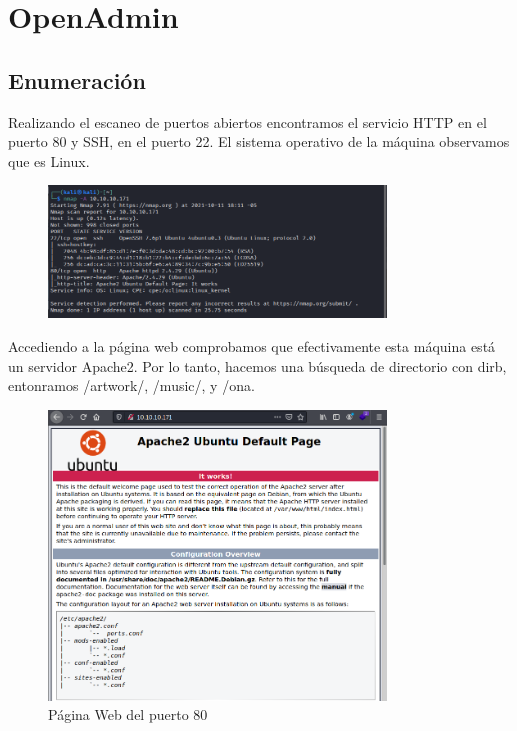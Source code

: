 \documentclass{article}
\begin{document}


\clearpage
\tableofcontents
\clearpage
\section{OpenAdmin}
\subsection{Enumeración}

Realizando el escaneo de puertos abiertos encontramos el servicio HTTP en el puerto 80 y SSH, en el puerto 22. El sistema operativo de la máquina observamos que es Linux.
\begin{figure}[H]
	\center
	\includegraphics[width=0.8\textwidth]{images/openadmin/1-escaneo.png}
	\caption{}
\end{figure}

Accediendo a la página web comprobamos que efectivamente esta máquina está un servidor Apache2. Por lo tanto, hacemos una búsqueda de directorio con dirb, entonramos /artwork/, /music/, y /ona.
\begin{figure}[H]
	\center
	\includegraphics[width=0.8\textwidth]{images/openadmin/2-paginaweb.png}
	\caption{Página Web del puerto 80}
\end{figure}	
\end{document}
